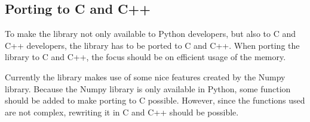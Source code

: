 \documentclass[a4paper,11pt]{report}
\begin{document}
    \subsection{Porting to C and C++}

    To make the library not only available to Python developers, but also to C and C++ developers, the library has to be ported to C and C++. When porting the library to C and C++, the focus should be on
    efficient usage of the memory.

    Currently the library makes use of some nice features created by the Numpy library. Because the Numpy library is only available in Python, some function should be added to make porting to C possible.
    However, since the functions used are not complex, rewriting it in C and C++ should be possible.

    \nocite{*}
    
    

    
\end{document}
